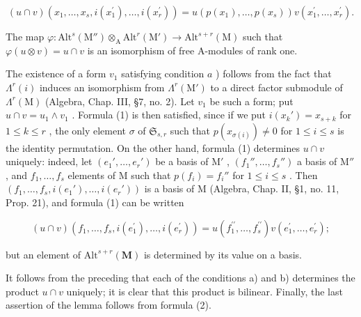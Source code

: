 \[
(u \cap v) (x _ {1}, \dots , x _ {s}, i (x _ {1} ^ {\prime}), \dots , i (x _ {r} ^ {\prime})) = u (p (x _ {1}), \dots , p (x _ {s})) v (x _ {1} ^ {\prime}, \dots , x _ {r} ^ {\prime}).\tag{1}
\]

The map \(\varphi : \mathrm{Alt}^s (\mathrm{M}'')\otimes_{\mathrm{A}}\mathrm{Alt}^r (\mathrm{M}')\to \mathrm{Alt}^{s + r}(\mathrm{M})\) such that \(\varphi (u\otimes v) = u\cap v\) is an isomorphism of free A-modules of rank one.

The existence of a form \(v_{1}\) satisfying condition \(a\) ) follows from the fact that \(\Lambda^r (i)\) induces an isomorphism from \(\Lambda^r (\mathrm{M}')\) to a direct factor submodule of \(\Lambda^r (\mathrm{M})\) (Algebra, Chap. III, §7, no. 2). Let \(v_{1}\) be such a form; put \(u\cap v = u_{1}\wedge v_{1}\) . Formula (1) is then satisfied, since if we put \(i(x_k') = x_{s + k}\) for \(1\leq k\leq r\) , the only element \(\sigma\) of \(\mathfrak{S}_{s,r}\) such that \(p(x_{\sigma (i)})\neq 0\) for \(1\leq i\leq s\) is the identity permutation. On the other hand, formula (1) determines \(u\cap v\) uniquely: indeed, let \((e_1',\ldots ,e_r')\) be a basis of \(\mathrm{M}'\) , \((f_1'',\dots,f_s'')\) a basis of \(\mathrm{M}''\) , and \(f_{1},\ldots ,f_{s}\) elements of \(\mathrm{M}\) such that \(p(f_i) = f_i''\) for \(1\leq i\leq s\) . Then \((f_{1},\ldots ,f_{s},i(e_1'),\ldots ,i(e_r'))\) is a basis of \(\mathrm{M}\) (Algebra, Chap. II, §1, no. 11, Prop. 21), and formula (1) can be written

\[
(u \cap v) (f _ {1}, \dots , f _ {s}, i (e _ {1} ^ {\prime}), \dots , i (e _ {r} ^ {\prime})) = u (f _ {1} ^ {\prime \prime}, \dots , f _ {s} ^ {\prime \prime}) v (e _ {1} ^ {\prime}, \dots , e _ {r} ^ {\prime});\tag{2}
\]

but an element of \(\mathrm{Alt}^{s + r}(\mathbf{M})\) is determined by its value on a basis.

It follows from the preceding that each of the conditions a) and b) determines the product \(u \cap v\) uniquely; it is clear that this product is bilinear. Finally, the last assertion of the lemma follows from formula (2).
\relax{}
